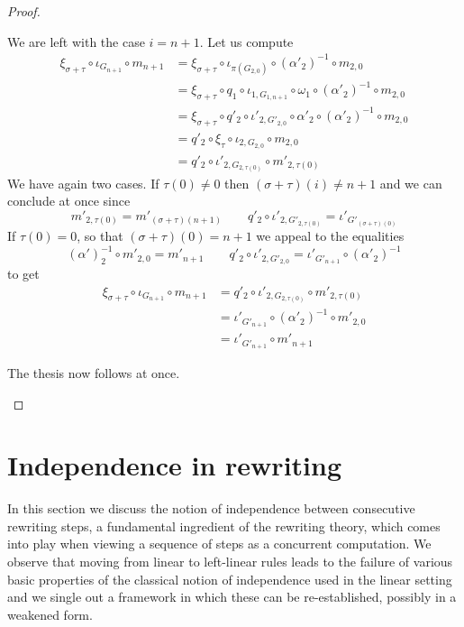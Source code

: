 \documentclass[a4paper,UKenglish,cleveref,pdftex,thm-restate,numberwithinsect,anonymous]{lipics}
\begin{document}
\begin{proof}
\begin{itemize}
\begin{itemize}
      We are left with the case $i=n+1$. Let us compute
      \begin{align*}
        \xi_{\sigma+\tau}\circ \iota_{G_{n+1}} \circ m_{n+1} & = \xi_{\sigma+\tau} \circ \iota_{\pi(G_{2,0})} \circ (\alpha'_2)^{-1}\circ m_{2,0} \\&=\xi_{\sigma+\tau} \circ q_1\circ \iota_{1, G_{1,n+1}} \circ \omega_1 \circ (\alpha'_2)^{-1}\circ m_{2,0}\\&=\xi_{\sigma+\tau} \circ q'_2 \circ \iota'_{2,G'_{2,0}} \circ \alpha'_2 \circ (\alpha'_2)^{-1}\circ m_{2,0} \\&=q'_2 \circ \xi_\tau \circ \iota_{2, G_{2,0}} \circ m_{2,0}\\&=q'_2\circ \iota'_{2, G_{2,\tau(0)}} \circ m'_{2,\tau(0)}
      \end{align*}
      We have again two cases. If $\tau(0)\neq 0$ then $(\sigma+\tau)(i)\neq n+1$ and we can conclude at once since
      \[m'_{2, \tau(0)}=m'_{(\sigma+\tau)(n+1)} \qquad q'_2\circ \iota'_{2, G'_{2,\tau(0)}}=
        \iota'_{G'_{(\sigma+\tau)(0)}}\]
      If $\tau(0)=0$, so that  $(\sigma+\tau)(0)= n+1$ we appeal to the equalities
      \[(\alpha')^{-1}_2\circ m'_{2, 0}=m'_{n+1} \qquad q'_2\circ \iota'_{2, G'_{2, 0}}=
        \iota'_{G'_{n+1}}\circ (\alpha'_2)^{-1}\]
      to get
      \begin{align*}
        \xi_{\sigma+\tau}\circ \iota_{G_{n+1}} \circ m_{n+1} & = q'_2\circ \iota'_{2, G_{2,\tau(0)}} \circ m'_{2,\tau(0)} \\&=	\iota'_{G'_{n+1}}\circ (\alpha'_2)^{-1}\circ m'_{2,0}\\&=\iota'_{G'_{n+1}}\circ  m'_{n+1}
      \end{align*}
    \end{itemize}
    The thesis now follows at once.	 \qedhere
  \end{itemize} \end{proof}
\fi




\section{Independence in rewriting}
\label{sec:equi}

In this section we discuss the notion of independence between
consecutive rewriting steps, a fundamental ingredient of the rewriting
theory, which comes into play when viewing a sequence of steps as a
concurrent computation. We observe that moving from linear to
left-linear rules leads to the failure of various basic properties of
the classical notion of independence used in the linear setting and we
single out a framework in which these can be re-established, possibly
in a weakened form.
\end{document}
